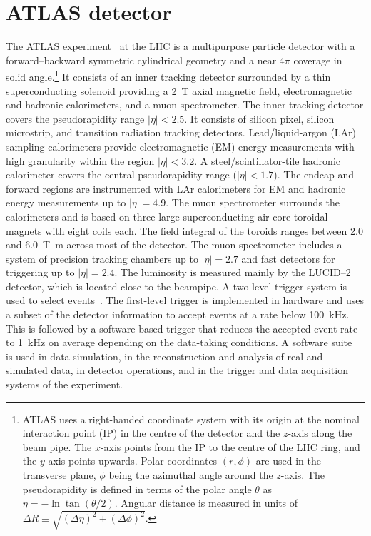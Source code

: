 \documentclass[atlasdraft=false, cernpreprint, UKenglish, texmf, orcidlogo]{atlasdoc}
\begin{document}

 

\section{ATLAS detector}
\label{sec:atlas-detector}
 
\newcommand{\AtlasCoordFootnote}{
ATLAS uses a right-handed coordinate system with its origin at the nominal interaction point (IP)
in the centre of the detector and the \(z\)-axis along the beam pipe.
The \(x\)-axis points from the IP to the centre of the LHC ring,
and the \(y\)-axis points upwards.
Polar coordinates \((r,\phi)\) are used in the transverse plane,
\(\phi\) being the azimuthal angle around the \(z\)-axis.
The pseudorapidity is defined in terms of the polar angle \(\theta\) as \(\eta = -\ln \tan(\theta/2)\).
Angular distance is measured in units of \(\Delta R \equiv \sqrt{(\Delta\eta)^{2} + (\Delta\phi)^{2}}\).}
 
 
The ATLAS experiment~\cite{PERF-2007-01} at the LHC is a multipurpose particle detector
with a forward--backward symmetric cylindrical geometry and a near \(4\pi\) coverage in
solid angle.\footnote{\AtlasCoordFootnote}
It consists of an inner tracking detector surrounded by a thin superconducting solenoid
providing a \qty{2}{\tesla} axial magnetic field, electromagnetic and hadronic calorimeters, and a muon spectrometer.
The inner tracking detector covers the pseudorapidity range \(|\eta| < 2.5\).
It consists of silicon pixel, silicon microstrip, and transition radiation tracking detectors.
Lead/liquid-argon (LAr) sampling calorimeters provide electromagnetic (EM) energy measurements
with high granularity within the region \(|\eta|< 3.2\).
A steel/scintillator-tile hadronic calorimeter covers the central pseudorapidity range (\(|\eta| < 1.7\)).
The endcap and forward regions are instrumented with LAr calorimeters
for EM and hadronic energy measurements up to \(|\eta| = 4.9\).
The muon spectrometer surrounds the calorimeters and is based on
three large superconducting air-core toroidal magnets with eight coils each.
The field integral of the toroids ranges between \num{2.0} and \qty{6.0}{\tesla\metre}
across most of the detector.
The muon spectrometer includes a system of precision tracking chambers up to \(|\eta| = 2.7\) and fast detectors for triggering up to \(|\eta| = 2.4\).
The luminosity is measured mainly by the LUCID--2~\cite{LUCID2} detector, which is located close to the beampipe.
A two-level trigger system is used to select events~\cite{TRIG-2016-01}.
The first-level trigger is implemented in hardware and uses a subset of the detector information
to accept events at a rate below \qty{100}{\kHz}.
This is followed by a software-based trigger that
reduces the accepted event rate to \qty{1}{\kHz} on average
depending on the data-taking conditions.
A software suite~\cite{ATL-SOFT-PUB-2021-001} is used in data simulation, in the reconstruction
and analysis of real and simulated data, in detector operations, and in the trigger and data acquisition
systems of the experiment.
 
\end{document}
